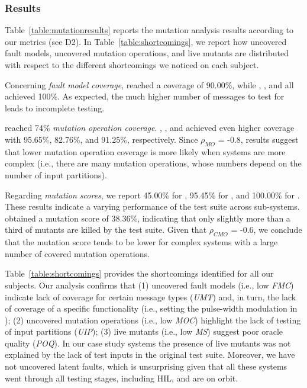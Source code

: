 \subsubsection*{Results}





Table~\ref{table:mutationresults} reports the mutation analysis results according to our metrics (see D2).
In Table~\ref{table:shortcomings}, we report how uncovered fault models, uncovered mutation operations, and live mutants are distributed with respect to the different shortcomings we noticed on each subject.

Concerning \emph{fault model coverage}, \ADCS reached a coverage of 90.00\%, while \GPS, \PDHU, and \PARAM all achieved 100\%.  
As expected, the much higher number of messages to test for \ADCS leads to incomplete testing. 

\ADCS reached 74\% \emph{mutation operation coverage}. \GPS, \PDHU, and \PARAM  achieved even higher coverage with 95.65\%, 82.76\%, and 91.25\%,  respectively. Since 
$\rho_{MO}$ = -0.8, results suggest that lower mutation operation coverage is more likely when systems are more complex (i.e., there are many mutation operations, whose numbers depend on the number of input partitions). 

Regarding \emph{mutation scores}, we report 45.00\% for \ADCS,  95.45\% for \GPS,  and 100.00\% for \PDHU. These results indicate a varying performance of the \SVF test suite across sub-systems.
\PARAM obtained a mutation score of 38.36\%, indicating that only slightly more than a third of mutants are killed by the test suite.
Given that 
$\rho_{CMO}$ = -0.6, 
we conclude that the mutation score tends to be lower for complex systems with a large number of covered mutation operations.

Table~\ref{table:shortcomings} provides the shortcomings identified for all our subjects. 
Our analysis confirms that (1) uncovered fault models (i.e., low \emph{FMC}) indicate lack of coverage for certain message types (\emph{UMT}) and, in turn, the lack of coverage of a specific functionality (i.e., setting the pulse-width modulation in \ADCS); (2) uncovered mutation operations (i.e., low \emph{MOC}) highlight the lack of testing of input partitions (\emph{UIP}); (3) live mutants (i.e., low \emph{MS}) suggest poor oracle quality (\emph{POQ}). In our case study systems the presence of live mutants was not explained by the lack of test inputs in the original test suite. Moreover, we have not uncovered latent faults, which is unsurprising given that all these systems went through all testing stages, including HIL, and are on orbit. 

